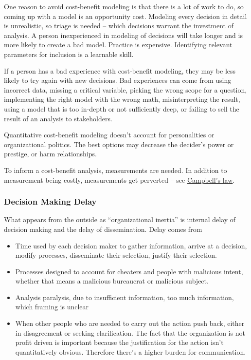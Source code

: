 One reason to avoid cost-benefit modeling is that there is a lot of work to do, so coming up with a model is an opportunity cost. Modeling every decision in detail is unrealistic, so triage is needed -- which decisions warrant the investment of analysis. A person inexperienced in modeling of decisions will take longer and is more likely to create a bad model. Practice is expensive. Identifying relevant parameters for inclusion is a learnable skill. 

If a person has a bad experience with cost-benefit modeling, they may be less likely to try again with new decisions. Bad experiences can come from using incorrect data, missing a critical variable, picking the wrong scope for a question, implementing the right model with the wrong math, misinterpreting the result, using a model that is too in-depth or not sufficiently deep, or failing to sell the result of an analysis to stakeholders.

Quantitative cost-benefit modeling doesn't account for personalities or organizational politics. The best options may decrease the decider's power or prestige, or harm relationships. 

To inform a cost-benefit analysis, measurements are needed. In addition to measurement being costly, measurements get perverted -- see \href{https://en.wikipedia.org/wiki/Campbell\%27s_law}{Campbell's law}. 

\subsubsection{Decision Making Delay\label{sec:decision-delay}}

What appears from the outside as ``organizational inertia'' is internal delay of decision making and the delay of dissemination. 
Delay comes from
\begin{itemize}
    \item Time used by each decision maker to gather information, arrive at a decision, modify processes, disseminate their selection, justify their selection. 
    \item Processes designed to account for cheaters and people with malicious intent, whether that means a malicious bureaucrat or malicious subject. 
\item Analysis paralysis, due to {insufficient information, too much information, which framing is unclear}
\item When other people who are needed to carry out the action push back, either in disagreement or seeking clarification. The fact that the organization is not profit driven is important because the justification for the action isn't quantitatively obvious. Therefore there's a higher burden for communication.
\end{itemize}


